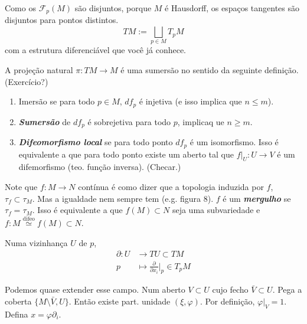 \begin{defn}\leavevmode
Como os \(\mathcal{F}_p(M)\) são disjuntos, porque \(M\) é Hausdorff, os espaços tangentes são disjuntos para pontos distintos.
\[TM:=\bigsqcup_{p \in M}T_pM\]
com a estrutura diferenciável que você já conhece.

A projeção natural \(\pi:TM \to M\) é uma sumersão no sentido da seguinte definição. (Exercício?)
\end{defn}

\begin{defn}\leavevmode
\begin{enumerate}
\item Imersão se para todo \(p \in M\), \(df_p\) é injetiva (e isso implica que \(n \leq  m\)).
\item \textit{\textbf{Sumersão}} de \(df_p\) é sobrejetiva para todo \(p\), implicaq ue \( n \geq  m\).
\item \textit{\textbf{Difeomorfismo local}} se para todo ponto \(df_p\) é um isomorfismo. Isso é equivalente a que para todo ponto existe um aberto tal que \(f|_{U}:U \to V\) é um difemorfismo (teo. função inversa). (Checar.)
\end{enumerate}
\end{defn}

Note que \(f: M \to N\) contínua é como dizer que a topologia induzida por \(f\), \(\tau_f \subset \tau_M\). Mas a igualdade nem sempre tem (e.g. figura 8). \(f\) é um \textit{\textbf{mergulho }} se \(\tau_f = \tau_M\). Isso é equivalente a que \(f(M) \subset N\) seja uma subvariedade e \(f:M \overset{\operatorname{difeo}}{\simeq}f(M)\subset N\).

\begin{defn}\leavevmode
Numa vizinhança \(U\) de \(p\),
\begin{align*}
	\partial : U &\longrightarrow TU\subset TM \\
	p &\longmapsto \frac{\partial }{\partial x_i}\Big|_{p}\in T_pM
\end{align*}
\end{defn}

\begin{remark}\leavevmode
Podemos quase extender esse campo. Num aberto \(V \subset U\) cujo fecho \(\bar{V} \subset U\). Pega a coberta \(\{ M \setminus \bar{V}, U\}\). Então existe part. unidade  \((\xi,\varphi)\). Por definição, \(\varphi|_{V} =1\). Defina \(x= \varphi \partial_i\).
\end{remark}

